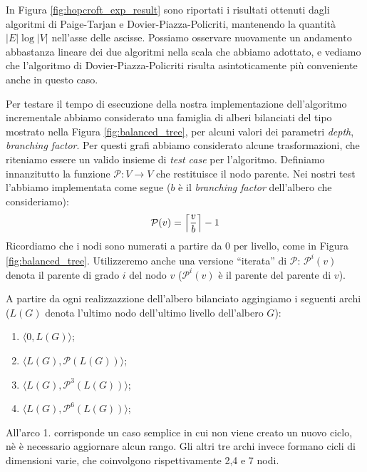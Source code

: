 In Figura \ref{fig:hopcroft_exp_result} sono riportati i risultati ottenuti dagli algoritmi di Paige-Tarjan e Dovier-Piazza-Policriti, mantenendo la quantità $|E| \log |V|$ nell'asse delle ascisse. Possiamo osservare nuovamente un andamento abbastanza lineare dei due algoritmi nella scala che abbiamo adottato, e vediamo che l'algoritmo di Dovier-Piazza-Policriti risulta asintoticamente più conveniente anche in questo caso.

Per testare il tempo di esecuzione della nostra implementazione dell'algoritmo incrementale abbiamo considerato una famiglia di alberi bilanciati del tipo mostrato nella Figura \ref{fig:balanced_tree}, per alcuni valori dei parametri \emph{depth}, \emph{branching factor}. Per questi grafi abbiamo considerato alcune trasformazioni, che riteniamo essere un valido insieme di \emph{test case} per l'algoritmo. Definiamo innanzitutto la funzione $\mathcal{P} : V \to V$ che restituisce il nodo parente. Nei nostri test l'abbiamo implementata come segue ($b$ è il \emph{branching factor} dell'albero che consideriamo):
\begin{gather*}
    \mathcal{P}(v) = \ceil[\Big]{\frac{v}{b}} - 1
\end{gather*}
Ricordiamo che i nodi sono numerati a partire da 0 per livello, come in Figura \ref{fig:balanced_tree}. Utilizzeremo anche una versione ``iterata'' di $\mathcal{P}$: $\mathcal{P}^i(v)$ denota il parente di grado $i$ del nodo $v$ ($\mathcal{P}^i(v)$ è il parente del parente di $v$).

A partire da ogni realizzazzione dell'albero bilanciato aggingiamo i seguenti archi ($L(G)$ denota l'ultimo nodo dell'ultimo livello dell'albero $G$):
\begin{enumerate}
    \item $\langle 0, L(G)\rangle$;
    \item $\langle L(G), \mathcal{P}(L(G))\rangle$;
    \item $\langle L(G), \mathcal{P}^3(L(G))\rangle$;
    \item $\langle L(G), \mathcal{P}^6(L(G))\rangle$;
\end{enumerate}
All'arco 1. corrisponde un caso semplice in cui non viene creato un nuovo ciclo, nè è necessario aggiornare alcun rango. Gli altri tre archi invece formano cicli di dimensioni varie, che coinvolgono rispettivamente 2,4 e 7 nodi.

